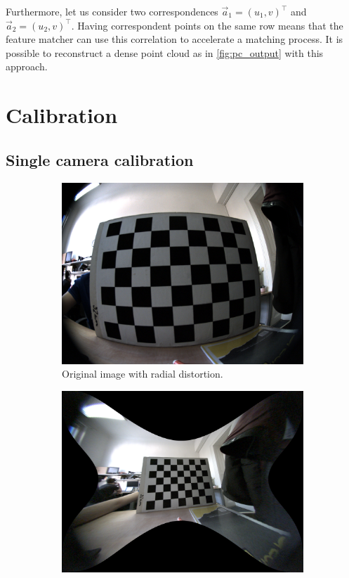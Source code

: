 Furthermore, let us consider two correspondences $\vec{a}_1 = (u_1, v)^\top$ and $\vec{a}_2 = (u_2, v)^\top $. 
Having correspondent points on the same row means that the feature matcher can use this correlation to accelerate a matching process.
It is possible to reconstruct a dense point cloud as in \autoref{fig:pc_output} with this approach.

\section{Calibration}
\label{sec:prelimin_calibration}
\subsection{Single camera calibration}

\begin{figure}[h]
    \begin{subfigure}[b]{0.45\textwidth}
      \includegraphics[width=\textwidth]{graphics/chessboard_img.png}
      \caption{Original image with radial distortion.}
      \label{fig:chb1}
    \end{subfigure}
    \hfill
    \begin{subfigure}[b]{0.45\textwidth}
      \includegraphics[width=\textwidth]{graphics/chessboard_img_rect.png}

\end{subfigure}
\end{figure}
